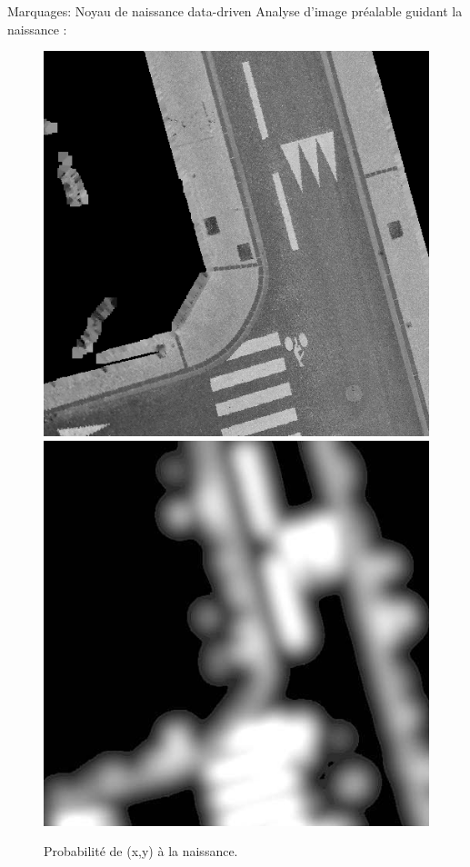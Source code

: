 \documentclass{beamer}
\begin{document}
\begin{frame}{Marquages: Noyau de naissance data-driven}
Analyse d'image préalable guidant la naissance :
\begin{figure}
\centering
\includegraphics[width = 0.4\linewidth]{1}
\includegraphics[width = 0.4\linewidth]{22}
\caption{Probabilité de (x,y) à la naissance.}
\end{figure}
\end{frame}
\end{document}
